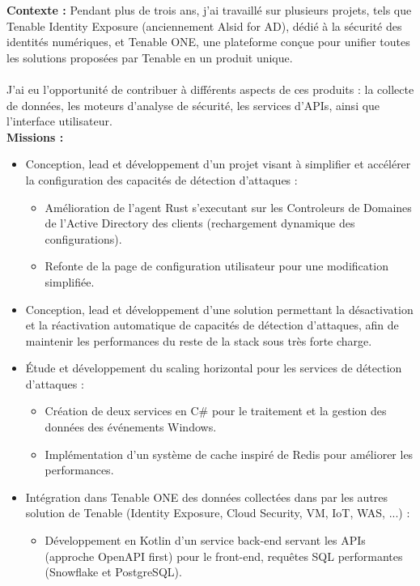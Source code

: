 \documentclass[8pt]{developercv} %
\begin{document}
\textbf{Contexte :} Pendant plus de trois ans, j'ai travaillé sur plusieurs projets, tels que Tenable Identity Exposure (anciennement Alsid for AD), dédié à la sécurité des identités numériques, et Tenable ONE, une plateforme conçue pour unifier toutes les solutions proposées par Tenable en un produit unique.\\\\
J'ai eu l'opportunité de contribuer à différents aspects de ces produits : la collecte de données, les moteurs d'analyse de sécurité, les services d'APIs, ainsi que l'interface utilisateur.\\

\textbf{Missions :}
\begin{itemize}
    \item Conception, lead et développement d’un projet visant à simplifier et accélérer la configuration des capacités de détection d’attaques :
        \begin{itemize}
            \item Amélioration de l’agent Rust s’executant sur les Controleurs de Domaines de l’Active Directory des clients (rechargement dynamique des configurations).
            \item Refonte de la page de configuration utilisateur pour une modification simplifiée.
        \end{itemize}
    \item Conception, lead et développement d'une solution permettant la désactivation et la réactivation automatique de capacités de détection d'attaques, afin de maintenir les performances du reste de la stack sous très forte charge.
    \item Étude et développement du scaling horizontal pour les services de détection d’attaques :
        \begin{itemize}
            \item Création de deux services en C\# pour le traitement et la gestion des données des événements Windows.
            \item Implémentation d’un système de cache inspiré de Redis pour améliorer les performances.
        \end{itemize}
    \item Intégration dans Tenable ONE des données collectées dans par les autres solution de Tenable (Identity Exposure, Cloud Security, VM, IoT, WAS, ...) :
        \begin{itemize}
            \item Développement en Kotlin d’un service back-end servant les APIs (approche OpenAPI first) pour le front-end, requêtes SQL performantes (Snowflake et PostgreSQL).

\end{itemize}
\end{itemize}
\end{document}
